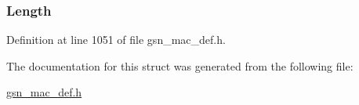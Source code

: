 \hypertarget{a00127_a92c9c711d62ad0b99ad1f6c2a94f7bc2}{
\subsubsection[{Length}]{ {\bf Length}}}
\label{a00127_a92c9c711d62ad0b99ad1f6c2a94f7bc2}


Definition at line 1051 of file gsn\_\-mac\_\-def.h.



The documentation for this struct was generated from the following file:\begin{DoxyCompactItemize}
\item 
\hyperlink{a00522}{gsn\_\-mac\_\-def.h}\end{DoxyCompactItemize}
